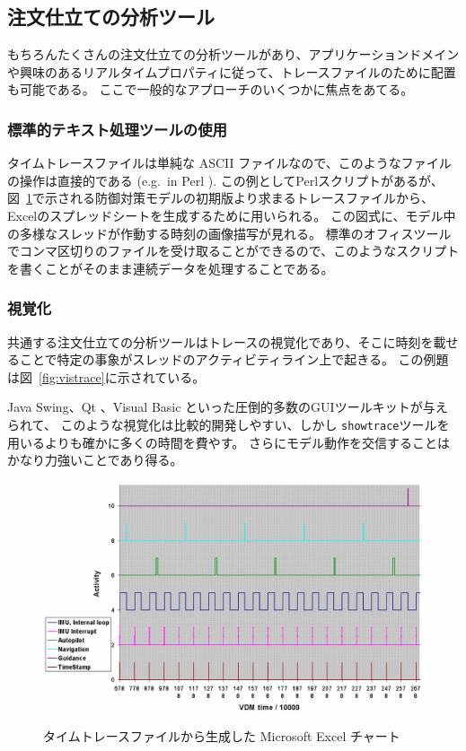 \documentclass[\pformat,12pt]{jreport}
\begin{document}
\subsection{注文仕立ての分析ツール}

もちろんたくさんの注文仕立ての分析ツールがあり、アプリケーションドメインや興味のあるリアルタイムプロパティに従って、トレースファイルのために配置も可能である。
ここで一般的なアプローチのいくつかに焦点をあてる。

\subsubsection{標準的テキスト処理ツールの使用}

タイムトレースファイルは単純な ASCII ファイルなので、このようなファイルの操作は直接的である (e.g.\ in Perl \cite{Wall&92}). 
この例としてPerlスクリプトがあるが、図~\ref{fig:chartExcel}で示される防御対策モデルの初期版より求まるトレースファイルから、Excelのスプレッドシートを生成するために用いられる。
この図式に、モデル中の多様なスレッドが作動する時刻の画像描写が見れる。
標準のオフィスツールでコンマ区切りのファイルを受け取ることができるので、このようなスクリプトを書くことがそのまま連続データを処理することである。

\subsubsection{視覚化}

共通する注文仕立ての分析ツールはトレースの視覚化であり、そこに時刻を載せることで特定の事象がスレッドのアクティビティライン上で起きる。
この例題は図~\ref{fig:vistrace}に示されている。

 Java Swing\cite{JavaSwing}、Qt \cite{Qt}、Visual Basic \cite{VisualBasic}といった圧倒的多数のGUIツールキットが与えられて、 このような視覚化は比較的開発しやすい、しかし \texttt{showtrace}ツールを用いるよりも確かに多くの時間を費やす。
さらにモデル動作を交信することはかなり力強いことであり得る。

\begin{figure}
\begin{center}
\includegraphics[width=\textwidth]{analysismissile}
\end{center}
\caption{タイムトレースファイルから生成した Microsoft Excel チャート\label{fig:chartExcel}}
\end{figure}
\end{document}
